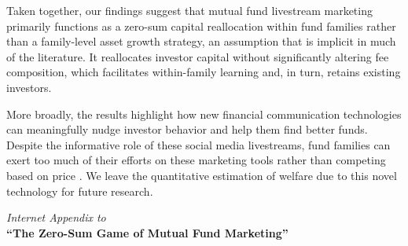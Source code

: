 \documentclass[12pt]{article}
\begin{document}
Taken together, our findings suggest that mutual fund livestream marketing primarily functions as a zero-sum capital reallocation within fund families rather than a family-level asset growth strategy, an assumption that is implicit in much of the literature. It reallocates investor capital without significantly altering fee composition, which facilitates within-family learning and, in turn, retains existing investors.

More broadly, the results highlight how new financial communication technologies can meaningfully nudge investor behavior and help them find better funds. Despite the informative role of these social media livestreams, fund families can exert too much of their efforts on these marketing tools rather than competing based on price \citep{roussanov2021marketing}. We leave the quantitative estimation of welfare due to this novel technology for future research. 


\newpage


\clearpage




\clearpage











\clearpage
\begingroup
\centering
\thispagestyle{empty}
\textit{\Large Internet Appendix to} \\
\textbf{\Large ``The Zero-Sum Game of Mutual Fund Marketing''}
\par
\endgroup

\clearpage
\setcounter{page}{1}

\appendix

\renewcommand{\tablename}{Table}
\renewcommand{\thetable}{A\arabic{table}}
\renewcommand{\thefigure}{A\arabic{figure}}

\makeatletter
\renewcommand{\theHtable}{appendix.\arabic{table}}
\renewcommand{\theHfigure}{appendix.\arabic{figure}}
\makeatother

\setcounter{table}{0}
\setcounter{figure}{0}
\end{document}
